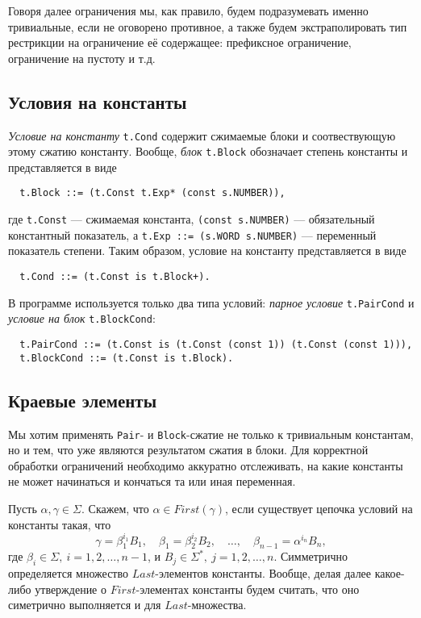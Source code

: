 \documentclass[12pt]{article}
\begin{document}
Говоря далее ограничения мы, как правило, будем подразумевать именно
тривиальные, если не оговорено противное, а также будем экстраполировать
тип рестрикции на ограничение её содержащее: префиксное ограничение,
ограничение на пустоту и т.д.

\subsection{Условия на константы}

\textit{Условие на константу} \texttt{t.Cond} содержит сжимаемые блоки и
соотвествующую этому сжатию константу. Вообще, \textit{блок} \texttt{t.Block}
обозначает степень константы и представляется в виде
\begin{Verbatim}
  t.Block ::= (t.Const t.Exp* (const s.NUMBER)),
\end{Verbatim}
где \texttt{t.Const} --- сжимаемая константа, \texttt{(const s.NUMBER)} ---
обязательный константный показатель, а \texttt{t.Exp ::= (s.WORD s.NUMBER)}
--- переменный показатель степени. Таким образом, условие на константу
представляется в виде
\begin{Verbatim}
  t.Cond ::= (t.Const is t.Block+).
\end{Verbatim}
В программе используется только два типа условий: \textit{парное условие}
\texttt{t.PairCond} и \textit{условие на блок} \texttt{t.BlockCond}:
\begin{Verbatim}
  t.PairCond ::= (t.Const is (t.Const (const 1)) (t.Const (const 1))),
  t.BlockCond ::= (t.Const is t.Block).
\end{Verbatim}

\subsection{Краевые элементы}

Мы хотим применять \texttt{Pair}- и \texttt{Block}-сжатие не только к
тривиальным константам, но и тем, что уже являются результатом сжатия в блоки.
Для корректной обработки ограничений необходимо аккуратно отслеживать, на какие
константы не может начинаться и кончаться та или иная переменная.

Пусть $\alpha, \gamma \in \Sigma$. Скажем, что $\alpha \in First(\gamma)$, если
существует цепочка условий на константы такая, что
\begin{displaymath}
  \gamma = \beta_1^{i_1} B_1,\quad
  \beta_1 = \beta_2^{i_2} B_2,\quad
  \dots,\quad
  \beta_{n-1} = \alpha^{i_n} B_n,
\end{displaymath}
где $\beta_i \in \Sigma, \ i = 1, 2, \dots, n - 1$, и $B_j \in \Sigma^*,
\ j = 1, 2, \dots, n$. Симметрично определяется множество $Last$-элементов константы.
Вообще, делая далее какое-либо утверждение о $First$-элементах константы будем
считать, что оно симетрично выполняется и для $Last$-множества.
\end{document}
